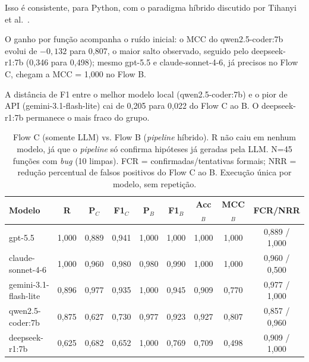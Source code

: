 \documentclass[sigconf]{acmart}
\begin{document}

Isso é consistente, para Python, com o paradigma híbrido discutido por Tihanyi et al.~\cite{tihanyi2025vulnerability}.


O ganho por função acompanha o ruído inicial: o MCC do qwen2.5-coder:7b evolui de $-0{,}132$ para 0,807, o maior salto observado, seguido pelo deepseek-r1:7b (0,346 para 0,498); mesmo gpt-5.5 e claude-sonnet-4-6, já precisos no Flow C, chegam a MCC = 1,000 no Flow B.


A distância de F1 entre o melhor modelo local (qwen2.5-coder:7b) e o pior de API (gemini-3.1-flash-lite) cai de 0,205 para 0,022 do Flow C ao B. O deepseek-r1:7b permanece o mais fraco do grupo.



\begin{table}[!t]
\caption{Flow C (somente LLM) vs. Flow B (\textit{pipeline} híbrido). R não caiu em nenhum modelo, já que o \textit{pipeline} só confirma hipóteses já geradas pela LLM. N=45 funções com \textit{bug} (10 limpas). FCR = confirmadas/tentativas formais; NRR = redução percentual de falsos positivos do Flow C ao B. Execução única por modelo, sem repetição.}

\label{tab:results}
\centering
\scriptsize
\begin{tabular}{lcccccccc}
\toprule
Modelo & R & P$_C$ & F1$_C$ & P$_B$ & F1$_B$ & Acc$_B$ & MCC$_B$ & FCR/NRR \\
\midrule
gpt-5.5 & 1,000 & 0,889 & 0,941 & 1,000 & 1,000 & 1,000 & 1,000 & 0,889 / 1,000 \\
claude-sonnet-4-6 & 1,000 & 0,960 & 0,980 & 0,980 & 0,990 & 1,000 & 1,000 & 0,960 / 0,500 \\
gemini-3.1-flash-lite & 0,896 & 0,977 & 0,935 & 1,000 & 0,945 & 0,909 & 0,770 & 0,977 / 1,000 \\
qwen2.5-coder:7b & 0,875 & 0,627 & 0,730 & 0,977 & 0,923 & 0,927 & 0,807 & 0,857 / 0,960 \\
deepseek-r1:7b & 0,625 & 0,682 & 0,652 & 1,000 & 0,769 & 0,709 & 0,498 & 0,909 / 1,000 \\
\bottomrule
\end{tabular}
\end{table}
\end{document}
